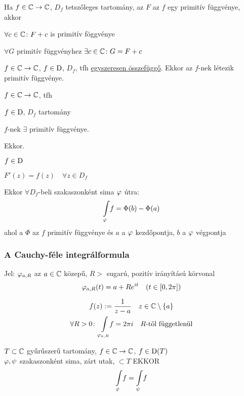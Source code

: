 \begin{te}
  Ha $f\in \mathbb{C}\to\mathbb{C}$, $D_f$ tetszőleges tartomány, az $F$ az $f$ egy primitív függvénye, akkor 
  \begin{enumzjr}
  \item $\forall c\in\mathbb{C}\colon F+c$ is primitív föggvénye
  \item $\forall G$ primitív függvényhez $\exists c\in\mathbb{C}\colon G = F+c$
  \end{enumzjr}
\end{te}

\begin{te}
  $f\in \mathbb{C}\to\mathbb{C}$, $f\in\operatorname{D}$, $D_f$, tfh \underline{egyszeresen összefüggő}. Ekkor az $f$-nek létezik primitív függvénye.
\end{te}

\begin{te}
  $f\in \mathbb{C}\to\mathbb{C}$, tfh
  \begin{enumzjr}
  \item $f\in \operatorname{D}$, $D_f$ tartomány
  \item $f$-nek $\exists$ primitív függvénye.
  \end{enumzjr}
  Ekkor.  \begin{enumzjr}
  \item $f\in \operatorname{D}$
  \item $F'(z)=f(z) \quad \forall z\in D_f$
  \end{enumzjr}
  Ekkor $\forall D_f$-beli szakaszonként sima $\varphi$ útra:
  \[\di\Int_\vfi\!f = \Phi(b) - \Phi(a) \]
  ahol a $\Phi$ az $f$ primitív függvénye és $a$ a $\varphi$ kezdőpontja, $b$ a $\varphi$ végpontja
\end{te}

\subsubsection{A Cauchy-féle integrálformula}
Jel: $\varphi_{a,R}$ az $a\in\mathbb{C}$ közepű, $R>$ sugarú, pozitív irányítású körvonal
  \[ \varphi_{a,R}(t) = a + Re^{it}\quad (t\in[0,2\pi])\]

\begin{lemma}
\begin{gather*}
  f(z) := \dfrac1{z-a}\quad z\in \C\setminus\{a\}\\
  \forall R>0\colon \di\Int_{\vfi_{a,R}}\!\!f = 2\pi i \quad R\text{-től függetlenül}
\end{gather*}
\end{lemma}

\begin{lemma} $T\subset \mathbb{C}$ gyűrűszerű tartomány, $f\in\mathbb{C}\to\mathbb{C}$, $f\in\operatorname{D}(T)$\\
  $\varphi,\psi$ szakaszonként sima, zárt utak, $\subset T$
  EKKOR
  \[ \di\Int_\vfi\!f = \Int_\psi\!f\]
\end{lemma}

